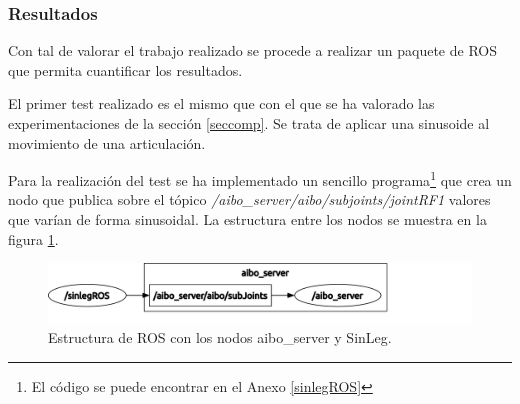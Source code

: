 \documentclass[12pt,a4paper,final,twoside]{article}
\begin{document}
\subsubsection{Resultados}
Con tal de valorar el trabajo realizado se procede a realizar un paquete de ROS que permita cuantificar los resultados.

El primer test realizado es el mismo que con el que se ha valorado las experimentaciones de la sección \ref{seccomp}. Se trata de aplicar una sinusoide al movimiento de una articulación.

Para la realización del test se ha implementado un sencillo programa\footnote{El código se puede encontrar en el Anexo \ref{sinlegROS}} que crea un nodo que publica sobre el tópico \textit{/aibo{\_}server/aibo/subjoints/jointRF1} valores que varían de forma sinusoidal. 
La estructura entre los nodos se muestra en la figura \ref{fig:ASSL}.
\begin{figure}[H]
	\centering
    \includegraphics[scale=0.35]{images/rosgraphASsin.pdf}
	 \caption{Estructura de ROS con los nodos aibo\_server y SinLeg.}
  \label{fig:ASSL}
\end{figure}
\end{document}
